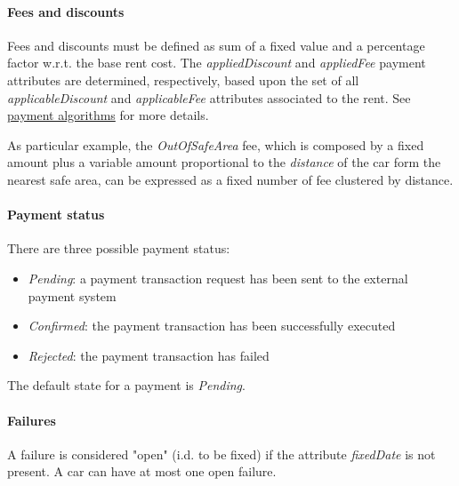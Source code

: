 \paragraph{Fees and discounts}
Fees and discounts must be defined as sum of a fixed value and a percentage factor w.r.t. the base rent cost.
The \emph{appliedDiscount} and \emph{appliedFee} payment attributes are determined, respectively, based upon the set of all \emph{applicableDiscount} and \emph{applicableFee} attributes associated to the rent. See \hyperref[sec:paymentAlgorithms]{payment algorithms} for more details.

As particular example, the \emph{OutOfSafeArea} fee, which is composed by a fixed amount plus a variable amount proportional to the \emph{distance} of the car form the nearest safe area, can be expressed as a fixed number of fee clustered by distance.

\paragraph{Payment status} There are three possible payment status:
\begin{itemize}
	\item \emph{Pending}: a payment transaction request has been sent to the external payment system
	\item \emph{Confirmed}: the payment transaction has been successfully executed
	\item \emph{Rejected}: the payment transaction has failed
\end{itemize}
The default state for a payment is \emph{Pending}.

\paragraph{Failures}A failure is considered "open" (i.d. to be fixed) if the attribute \emph{fixedDate} is not present. A car can have at most one open failure.

